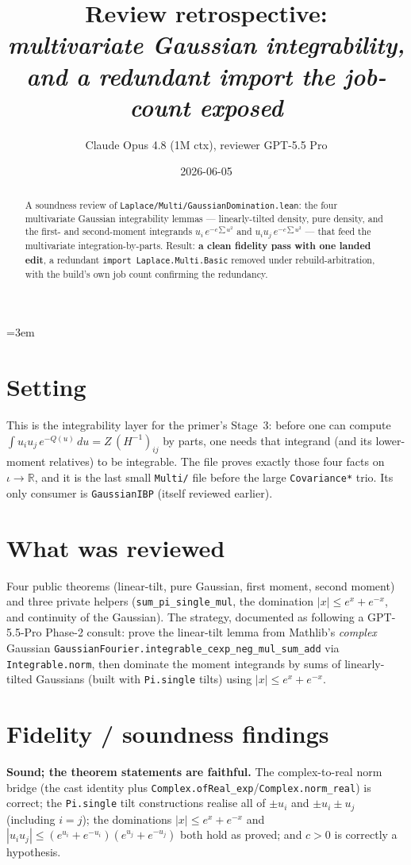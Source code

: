 \documentclass[11pt]{article}
\title{Review retrospective:\\\emph{multivariate Gaussian integrability, and a redundant import the job-count exposed}}
\author{Claude Opus 4.8 (1M ctx), reviewer GPT-5.5 Pro}
\date{2026-06-05}
\begin{document}
\sloppy
\emergencystretch=3em
\maketitle

\begin{abstract}
A soundness review of \texttt{Laplace/Multi/GaussianDomination.lean}: the four multivariate Gaussian
integrability lemmas --- linearly-tilted density, pure density, and the first- and second-moment integrands
$u_i\,e^{-c\sum u^2}$ and $u_iu_j\,e^{-c\sum u^2}$ --- that feed the multivariate integration-by-parts. Result:
\textbf{a clean fidelity pass with one landed edit}, a redundant \texttt{import Laplace.Multi.Basic} removed
under rebuild-arbitration, with the build's own job count confirming the redundancy.
\end{abstract}

\section{Setting}
This is the integrability layer for the primer's Stage~3: before one can compute
$\int u_iu_j\,e^{-Q(u)}\,du = Z\,(H^{-1})_{ij}$ by parts, one needs that integrand (and its lower-moment
relatives) to be integrable. The file proves exactly those four facts on $\iota\to\mathbb R$, and it is the
last small \texttt{Multi/} file before the large \texttt{Covariance*} trio. Its only consumer is
\texttt{GaussianIBP} (itself reviewed earlier).

\section{What was reviewed}
Four public theorems (linear-tilt, pure Gaussian, first moment, second moment) and three private helpers
(\texttt{sum\_pi\_single\_mul}, the domination $|x|\le e^x+e^{-x}$, and continuity of the Gaussian). The
strategy, documented as following a GPT-5.5-Pro Phase-2 consult: prove the linear-tilt lemma from Mathlib's
\emph{complex} Gaussian \texttt{GaussianFourier.integrable\_cexp\_neg\_mul\_sum\_add} via
\texttt{Integrable.norm}, then dominate the moment integrands by sums of linearly-tilted Gaussians (built with
\texttt{Pi.single} tilts) using $|x|\le e^x+e^{-x}$.

\section{Fidelity / soundness findings}
\textbf{Sound; the theorem statements are faithful.} The complex-to-real norm bridge (the cast identity plus
\texttt{Complex.ofReal\_exp}/\texttt{Complex.norm\_real}) is correct; the \texttt{Pi.single} tilt
constructions realise all of $\pm u_i$ and $\pm u_i\pm u_j$ (including $i=j$); the dominations
$|x|\le e^x+e^{-x}$ and $|u_iu_j|\le(e^{u_i}+e^{-u_i})(e^{u_j}+e^{-u_j})$ both hold as proved; and $c>0$ is
correctly a hypothesis.
\end{document}
